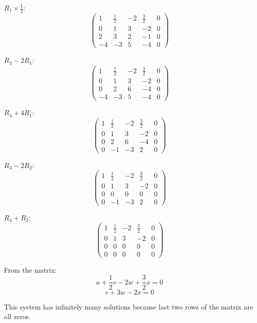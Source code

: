 \documentclass[12pt]{article}
\begin{document}
$R_1 \times \frac{1}{2}$:
\[
	\begin{pmatrix}
		1  & \frac{1}{2} & -2 & \frac{3}{2} & 0 \\
		0  & 1           & 3  & -2          & 0 \\
		2  & 3           & 2  & -1          & 0 \\
		-4 & -3          & 5  & -4          & 0
	\end{pmatrix}
\]

$R_3 - 2R_1$:
\[
	\begin{pmatrix}
		1 & \frac{1}{2} & -2 & \frac{3}{2} & 0 \\
		0 & 1           & 3  & -2          & 0 \\
		0 & 2           & 6  & -4          & 0 \\
		-4 & -3          & 5  & -4          & 0
	\end{pmatrix}
\]

$R_4 + 4R_1$:
\[
	\begin{pmatrix}
		1 & \frac{1}{2} & -2 & \frac{3}{2} & 0 \\
		0 & 1           & 3  & -2          & 0 \\
		0 & 2           & 6  & -4          & 0 \\
		0 & -1          & -3 & 2           & 0
	\end{pmatrix}
\]

$R_3 - 2R_2$:
\[
	\begin{pmatrix}
		1 & \frac{1}{2} & -2 & \frac{3}{2} & 0 \\
		0 & 1           & 3  & -2          & 0 \\
		0 & 0           & 0  & 0           & 0 \\
		0 & -1          & -3 & 2           & 0
	\end{pmatrix}
\]

$R_4 + R_2$:
\[
	\begin{pmatrix}
		1 & \frac{1}{2} & -2 & \frac{3}{2} & 0 \\
		0 & 1           & 3  & -2          & 0 \\
		0 & 0           & 0  & 0           & 0 \\
		0 & 0           & 0  & 0           & 0
	\end{pmatrix}
\]

From the matrix:
\[
	u + \frac{1}{2}v - 2w + \frac{3}{2}x = 0
\]
\[
	v + 3w - 2x = 0
\]

This system has infinitely many solutions because last two rows of the matrix are all zeros.
\end{document}
